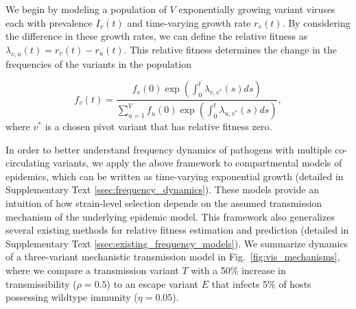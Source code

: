 \documentclass[11pt,oneside,letterpaper]{article}
\newcommand{\varEscape}{\eta}
\newcommand{\varTransmission}{\rho}
\begin{document}
We begin by modeling a population of $V$ exponentially growing variant viruses each with prevalence $I_v(t)$ and time-varying growth rate $r_v(t)$.
By considering the difference in these growth rates, we can define the relative fitness as $\lambda_{v, u}(t) = r_v(t) - r_u(t)$.
This relative fitness determines the change in the frequencies of the variants in the population

\begin{equation}
    f_v(t) = \frac{f_v(0) \exp \left( \int_0^t \lambda_{v, v^*}(s)ds \right)}{ \sum_{u=1}^{V} f_u(0) \exp \left( \int_0^t \lambda_{u, v^*}(s)ds \right)},
\end{equation}
where $v^*$ is a chosen pivot variant that has relative fitness zero.

In order to better understand frequency dynamics of pathogens with multiple co-circulating variants, we apply the above framework to compartmental models of epidemics, which can be written as time-varying exponential growth (detailed in Supplementary Text \ref{ssec:frequency_dynamics}).
These models provide an intuition of how strain-level selection depends on the assumed transmission mechanism of the underlying epidemic model.
This framework also generalizes several existing methods for relative fitness estimation and prediction (detailed in Supplementary Text \ref{ssec:existing_frequency_models}).
We summarize dynamics of a three-variant mechanistic transmission model in Fig.~\ref{fig:vis_mechanisms}, where we compare a transmission variant $T$ with a 50\% increase in transmissibility ($\varTransmission=0.5$) to an escape variant $E$ that infects 5\% of hosts possessing wildtype immunity ($\varEscape=0.05$).
\end{document}

